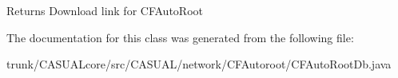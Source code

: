\begin{DoxyReturn}{Returns}
Download link for C\-F\-Auto\-Root 
\end{DoxyReturn}


The documentation for this class was generated from the following file\-:\begin{DoxyCompactItemize}
\item 
trunk/\-C\-A\-S\-U\-A\-Lcore/src/\-C\-A\-S\-U\-A\-L/network/\-C\-F\-Autoroot/C\-F\-Auto\-Root\-Db.\-java\end{DoxyCompactItemize}

